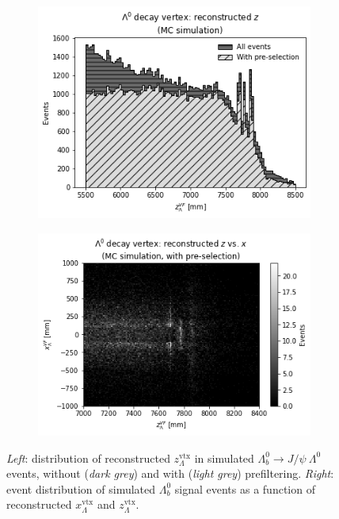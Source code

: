 \begin{figure}[t]
	\centering
	\begin{subfigure}{.45\textwidth}
		\includegraphics[width=\textwidth]{graphics/04-event_selection/Lambda_endvertex_z.png}
		\caption{}
	\end{subfigure}
	\begin{subfigure}{.45\textwidth}
		\includegraphics[width=\textwidth]{graphics/04-event_selection/Lambda_endvertex_z_vs_x.png}
		\caption{}
	\end{subfigure}
	\caption[A and b.]{\textit{Left}: distribution of reconstructed $z_\Lambda^\text{vtx}$ in simulated $\Lambda_b^0 \rightarrow J/\psi~\Lambda^0$ events, without (\textit{dark grey}) and with (\textit{light grey}) prefiltering. \textit{Right}: event distribution of simulated $\Lambda_b^0$ signal events as a function of reconstructed $x_\Lambda^\text{vtx}$ and $z_\Lambda^\text{vtx}$.}
\end{figure}

